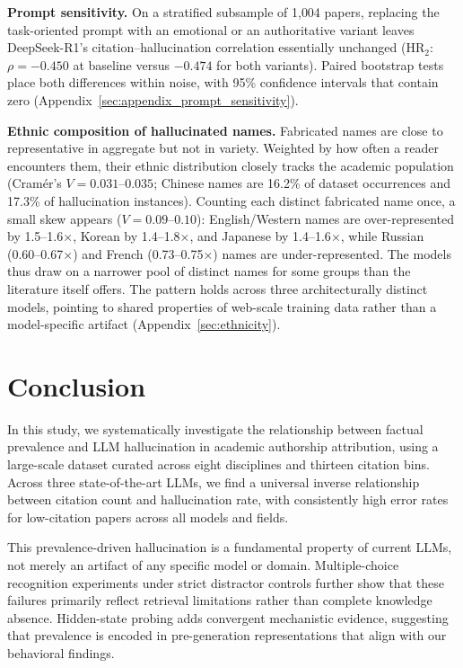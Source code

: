 \documentclass[11pt]{article}
\begin{document}
\textbf{Prompt sensitivity.} On a stratified subsample of 1{,}004 papers, replacing the task-oriented prompt with an emotional or an authoritative variant leaves DeepSeek-R1's citation--hallucination correlation essentially unchanged (HR$_2$: $\rho = -0.450$ at baseline versus $-0.474$ for both variants). Paired bootstrap tests place both differences within noise, with 95\% confidence intervals that contain zero (Appendix~\ref{sec:appendix_prompt_sensitivity}).

\textbf{Ethnic composition of hallucinated names.} Fabricated names are close to representative in aggregate but not in variety. Weighted by how often a reader encounters them, their ethnic distribution closely tracks the academic population (Cram\'er's $V = 0.031$--$0.035$; Chinese names are 16.2\% of dataset occurrences and 17.3\% of hallucination instances). Counting each distinct fabricated name once, a small skew appears ($V = 0.09$--$0.10$): English/Western names are over-represented by 1.5--1.6$\times$, Korean by 1.4--1.8$\times$, and Japanese by 1.4--1.6$\times$, while Russian (0.60--0.67$\times$) and French (0.73--0.75$\times$) names are under-represented. The models thus draw on a narrower pool of distinct names for some groups than the literature itself offers. The pattern holds across three architecturally distinct models, pointing to shared properties of web-scale training data rather than a model-specific artifact (Appendix~\ref{sec:ethnicity}).

\section{Conclusion}
\label{sec:conclusion}

In this study, we systematically investigate the relationship between factual prevalence and LLM hallucination in academic authorship attribution, using a large-scale dataset curated across eight disciplines and thirteen citation bins. Across three state-of-the-art LLMs, we find a universal inverse relationship between citation count and hallucination rate, with consistently high error rates for low-citation papers across all models and fields.

This prevalence-driven hallucination is a fundamental property of current LLMs, not merely an artifact of any specific model or domain. Multiple-choice recognition experiments under strict distractor controls further show that these failures primarily reflect retrieval limitations rather than complete knowledge absence. Hidden-state probing adds convergent mechanistic evidence, suggesting that prevalence is encoded in pre-generation representations that align with our behavioral findings.
\end{document}
